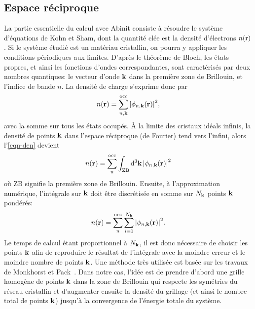 \subsection{Espace réciproque}
\label{subsec-reciprocal}
La partie essentielle du calcul avec Abinit consiste à résoudre le système d'équations de Kohn et Sham,
dont la quantité clée est la densité d'électrons $n(\textnormal{r})$.
Si le système étudié est un matériau cristallin,
on pourra y appliquer les conditions périodiques aux limites.
D'après le théorème de Bloch, les états propres, et ainsi les fonctions d'ondes correspondantes,
sont caractérisés par deux nombres quantiques:
le vecteur d'onde $\vb{k}$ dans la première zone de Brillouin, et l'indice de bande $n$.
La densité de charge s'exprime donc par
\begin{equation}
  \label{eqn-den}
  n(\vb{r}) = \sum_{n, \vb{k}}^{\textnormal{occ}}\abs{\phi_{n, \vb{k}}(\vb{r})}^2,
\end{equation}
avec la somme sur tous les états occupés.
À la limite des cristaux idéals infinis, la densité de points $\vb{k}$ dans l'espace réciproque (de Fourier) tend vers l'infini,
alors l'\cref{eqn-den} devient
\begin{equation*}
  n(\vb{r}) = \sum_n^{\textnormal{occ}}\int_{\textnormal{ZB}}\dd[3]{\vb{k}}\abs{\phi_{n, \vb{k}}(\vb{r})}^2
\end{equation*}
où ZB signifie la première zone de Brillouin. Ensuite, à l'approximation numérique,
l'intégrale sur $\vb{k}$ doit être discrétisée en somme sur $N_{\vb{k}}$ points $\vb{k}$ pondérés:
\begin{equation*}
  n(\vb{r}) = \sum_n^{\textnormal{occ}}\sum_{i=1}^{N_{\vb{k}}}\abs{\phi_{n, \vb{k}}(\vb{r})}^2.
\end{equation*}
Le temps de calcul étant proportionnel à $N_{\vb{k}}$,
il est donc nécessaire de choisir les points $\vb{k}$ afin de reproduire le résultat
de l'intégrale avec la moindre erreur et le moindre nombre de points $\vb{k}$.
Une méthode très utilisée est basée sur les travaux de Monkhorst et Pack~\cite{Monkhorst1976}.
Dans notre cas,
l'idée est de prendre d'abord une grille homogène de points $\vb{k}$ dans la zone de Brillouin
qui respecte les symétries du réseau cristallin et d'augmenter ensuite la densité du grillage (et ainsi le nombre total de points $\vb{k}$)
jusqu'à la convergence de l'énergie totale du système.

